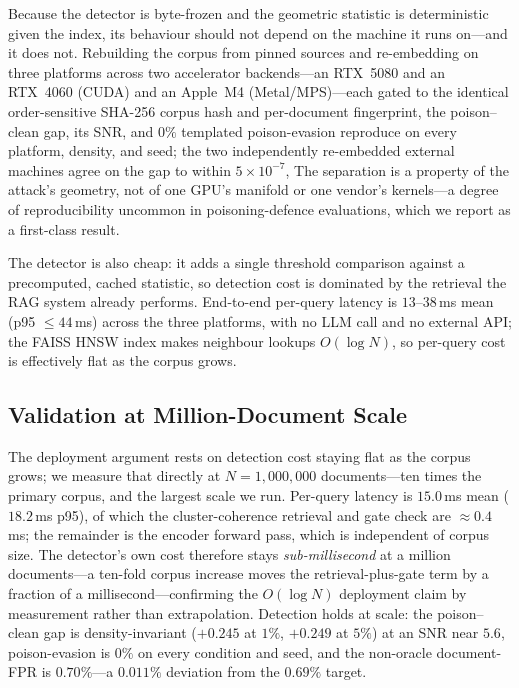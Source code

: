 \documentclass[10pt,journal,compsoc]{IEEEtran}
\begin{document}
Because the detector is byte-frozen and the geometric statistic is deterministic given the
index, its behaviour should not depend on the machine it runs on---and it does not. Rebuilding
the corpus from pinned sources and re-embedding on three platforms across two accelerator
backends---an RTX~5080 and an RTX~4060 (CUDA) and an Apple~M4 (Metal/MPS)---each gated to the
identical order-sensitive SHA-256 corpus hash and per-document fingerprint, the poison--clean
gap, its SNR, and $0\%$ templated poison-evasion reproduce on every platform, density, and seed;
the two independently re-embedded external machines agree on the gap to within $5\times10^{-7}$,
The separation is a property of the attack's
geometry, not of one GPU's manifold or one vendor's kernels---a degree of reproducibility
uncommon in poisoning-defence evaluations, which we report as a first-class result.

The detector is also cheap: it adds a single threshold comparison against a precomputed, cached
statistic, so detection cost is dominated by the retrieval the RAG system already performs.
End-to-end per-query latency is $13$--$38$\,ms mean (p95 $\le 44$\,ms) across the three platforms, with no LLM call and no external API; the FAISS HNSW index makes
neighbour lookups $O(\log N)$, so per-query cost is effectively flat as the corpus grows.

\subsection{Validation at Million-Document Scale}
\label{subsec:scale}
The deployment argument rests on detection cost staying flat as the corpus grows; we
measure that directly at $N=1{,}000{,}000$ documents---ten times the primary corpus,
and the largest scale we run. Per-query latency is $15.0$\,ms mean ($18.2$\,ms p95),
of which the cluster-coherence retrieval and gate check are $\approx\!0.4$\,ms; the
remainder is the encoder forward pass, which is independent of corpus size. The
detector's own cost therefore stays \emph{sub-millisecond} at a million
documents---a ten-fold corpus increase moves the retrieval-plus-gate term by a
fraction of a millisecond---confirming the $O(\log N)$ deployment claim by measurement
rather than extrapolation. Detection holds at scale: the
poison--clean gap is density-invariant ($+0.245$ at $1\%$, $+0.249$ at $5\%$) at an
SNR near $5.6$, poison-evasion is $0\%$ on every condition and seed, and the
non-oracle document-FPR is $0.70\%$---a $0.011\%$ deviation from the $0.69\%$
target.
\end{document}
